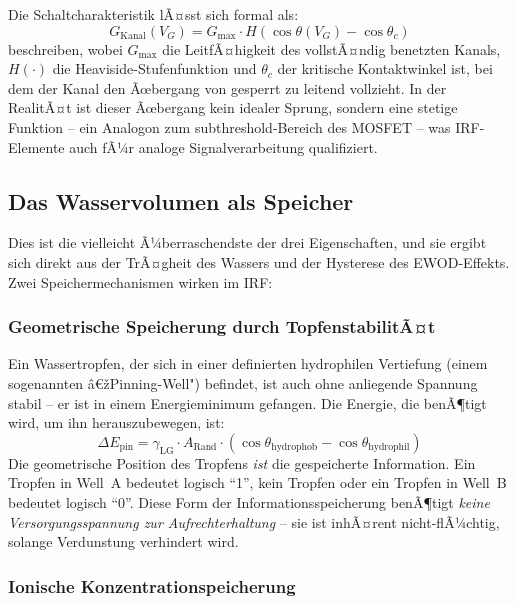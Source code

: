 ﻿\documentclass[a4paper,12pt]{scrreprt}
\theoremstyle{definition}
\begin{document}
Die Schaltcharakteristik lÃ¤sst sich formal als:
\begin{equation}
	G_{\mathrm{Kanal}}(V_G) = G_{\max} \cdot H\!\left(\cos\theta(V_G) - \cos\theta_c\right)
	\label{eq:schaltcharakteristik}
\end{equation}
beschreiben, wobei $G_{\max}$ die LeitfÃ¤higkeit des vollstÃ¤ndig benetzten
Kanals, $H(\cdot)$ die Heaviside-Stufenfunktion und $\theta_c$ der kritische
Kontaktwinkel ist, bei dem der Kanal den Ãœbergang von gesperrt zu leitend
vollzieht. In der RealitÃ¤t ist dieser Ãœbergang kein idealer Sprung, sondern
eine stetige Funktion -- ein Analogon zum subthreshold-Bereich des MOSFET --
was IRF-Elemente auch fÃ¼r analoge Signalverarbeitung qualifiziert.

\subsection{Das Wasservolumen als Speicher}

Dies ist die vielleicht Ã¼berraschendste der drei Eigenschaften, und sie
ergibt sich direkt aus der TrÃ¤gheit des Wassers und der Hysterese des
EWOD-Effekts. Zwei Speichermechanismen wirken im IRF:

\subsubsection{Geometrische Speicherung durch TopfenstabilitÃ¤t}

Ein Wassertropfen, der sich in einer definierten hydrophilen Vertiefung
(einem sogenannten â€žPinning-Well") befindet, ist auch ohne anliegende
Spannung stabil -- er ist in einem Energieminimum gefangen. Die Energie,
die benÃ¶tigt wird, um ihn herauszubewegen, ist:
\begin{equation}
	\Delta E_{\mathrm{pin}} = \gamma_{\mathrm{LG}} \cdot A_{\mathrm{Rand}} \cdot
	(\cos\theta_{\mathrm{hydrophob}} - \cos\theta_{\mathrm{hydrophil}})
	\label{eq:pinning_energie}
\end{equation}
Die geometrische Position des Tropfens \emph{ist} die gespeicherte Information.
Ein Tropfen in Well~A bedeutet logisch ``1'', kein Tropfen oder ein Tropfen
in Well~B bedeutet logisch ``0''. Diese Form der Informationsspeicherung
benÃ¶tigt \emph{keine Versorgungsspannung zur Aufrechterhaltung} -- sie ist
inhÃ¤rent nicht-flÃ¼chtig, solange Verdunstung verhindert wird.

\subsubsection{Ionische Konzentrationspeicherung}
\end{document}
